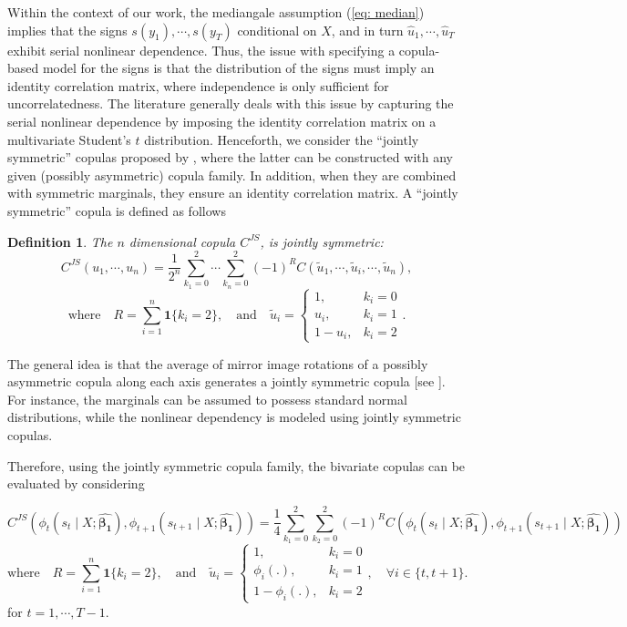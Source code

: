 \documentclass[harvard,11pt]{article}
\newtheorem{definition}{Definition}
\begin{document}
Within the context of our work, the mediangale assumption (\ref{eq: median}) implies that the signs $s(y_1),\cdots,s(y_T)$  conditional on $X$, and in turn $\hat{u}_1,\cdots,\hat{u}_T$ exhibit serial nonlinear dependence. Thus, the issue with specifying a copula-based model for the signs is that the distribution of the signs must imply an identity correlation matrix, where independence is only sufficient for uncorrelatedness. The literature generally deals with this issue by capturing the serial nonlinear dependence by imposing the identity correlation matrix on a multivariate Student's $t$ distribution. Henceforth, we consider the \textquotedblleft jointly symmetric\textquotedblright{ }copulas proposed by \citet{oh2016high}, where the latter can be constructed with any given (possibly asymmetric) copula family. In addition, when they are combined with symmetric marginals, they ensure an identity correlation matrix. A \textquotedblleft jointly symmetric\textquotedblright{ }copula is defined as follows
\begin{definition}
The $n$ dimensional copula $C^{JS}$, is jointly symmetric:
\[
C^{JS}\left(u_1,\cdots,u_n\right)=\frac{1}{2^n}\sum\limits_{k_1=0}^{2}\cdots\sum\limits_{k_n=0}^{2}\left(-1\right)^R C(\tilde{u}_1,\cdots,\tilde{u}_i,\cdots,\tilde{u}_n),
\] 
\[
\text{where}\quad R=\sum\limits_{i=1}^n\bm{1}\{k_i=2\},\quad\text{and}\quad\tilde{u}_i=
\begin{cases}
1,& k_i=0\\
u_i,&k_i=1\\
1-u_i,& k_i=2
\end{cases}.
\]
 \end{definition}
 The general idea is that the average of mirror image rotations of a possibly asymmetric copula along each axis generates a jointly symmetric copula [see \citet{oh2016high}]. For instance, the marginals can be assumed to possess standard normal distributions, while the nonlinear dependency is modeled using jointly symmetric copulas.  

Therefore, using the jointly symmetric copula family, the bivariate copulas can be evaluated by considering

\[
C^{JS}\left(\phi_t(s_t\mid X;\hat{\bm{\beta_1}}),\phi_{t+1}(s_{t+1}\mid X;\hat{\bm{\beta_1}})\right)=\frac{1}{4}\sum\limits_{k_1=0}^{2}\sum\limits_{k_2=0}^{2}\left(-1\right)^R C(\phi_t(s_t\mid X;\hat{\bm{\beta_1}}),\phi_{t+1}(s_{t+1}\mid X;\hat{\bm{\beta_1}}))
\]
\[
\text{where}\quad R=\sum\limits_{i=1}^n\bm{1}\{k_i=2\},\quad\text{and}\quad\tilde{u}_i=
\begin{cases}
1,& k_i=0\\
\phi_i(.),&k_i=1\\
1-\phi_i(.),& k_i=2
\end{cases},\quad \forall i\in\{t,t+1\}.
\]
for $t=1,\cdots,T-1$.
\end{document}
